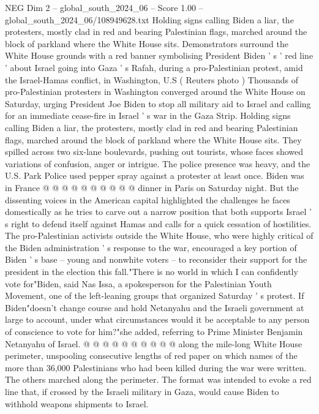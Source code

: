 \begin{textsample}{NEG Dim 2 – global\_south\_2024\_06 – Score 1.00 – global\_south\_2024\_06/108949628.txt}  \label{ex:f2_neg_329}
Holding signs calling Biden a liar, the protesters, mostly clad in red and bearing Palestinian flags, marched around the block of parkland where the White House sits.
Demonstrators surround the White House grounds with a red banner symbolising President Biden ' s ' red line ' about Israel going into Gaza ' s Rafah, during a pro-Palestinian protest, amid the Israel-Hamas conflict, in Washington, U.S ( Reuters photo ) Thousands of pro-Palestinian protesters in Washington converged around the White House on Saturday, urging President Joe Biden to stop all military aid to Israel and calling for an immediate cease-fire in Israel ' s war in the Gaza Strip.
Holding signs calling Biden a liar, the protesters, mostly clad in red and bearing Palestinian flags, marched around the block of parkland where the White House sits.
They spilled across two six-lane boulevards, pushing out tourists, whose faces showed variations of confusion, anger or intrigue.
The police presence was heavy, and the U.S.
Park Police used pepper spray against a protester at least once.
Biden was in France @ @ @ @ @ @ @ @ @ @ dinner in Paris on Saturday night.
But the dissenting voices in the American capital highlighted the challenges he faces domestically as he tries to carve out a narrow position that both supports Israel ' s right to defend itself against Hamas and calls for a quick cessation of hostilities.
The pro-Palestinian activists outside the White House, who were highly critical of the Biden administration ' s response to the war, encouraged a key portion of Biden ' s base -- young and nonwhite voters -- to reconsider their support for the president in the election this fall."There is no world in which I can confidently vote for"Biden, said Nas Issa, a spokesperson for the Palestinian Youth Movement, one of the left-leaning groups that organized Saturday ' s protest.
If Biden"doesn't change course and hold Netanyahu and the Israeli government at large to account, under what circumstances would it be acceptable to any person of conscience to vote for him?"she added, referring to Prime Minister Benjamin Netanyahu of Israel. @ @ @ @ @ @ @ @ @ @ along the mile-long White House perimeter, unspooling consecutive lengths of red paper on which names of the more than 36,000 Palestinians who had been killed during the war were written.
The others marched along the perimeter.
The format was intended to evoke a red line that, if crossed by the Israeli military in Gaza, would cause Biden to withhold weapons shipments to Israel.

\end{textsample}
